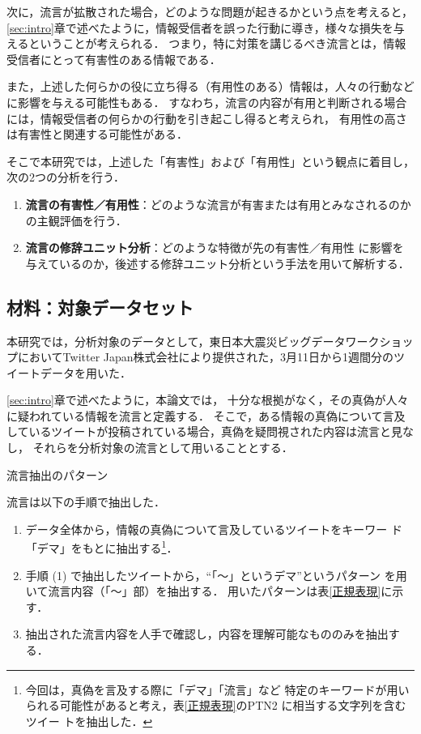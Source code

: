 \documentclass[japanese]{jnlp_1.4}
\begin{document}
次に，流言が拡散された場合，どのような問題が起きるかという点を考えると，
\ref{sec:intro}章で述べたように，情報受信者を誤った行動に導き，様々な損失を与えるということが考えられる．
つまり，特に対策を講じるべき流言とは，情報受信者にとって有害性のある情報である．

また，上述した何らかの役に立ち得る（有用性のある）情報は，人々の行動などに影響を与える可能性もある．
すなわち，流言の内容が有用と判断される場合には，情報受信者の何らかの行動を引き起こし得ると考えられ，
有用性の高さは有害性と関連する可能性がある．



そこで本研究では，上述した「有害性」および「有用性」という観点に着目し，次の2つの分析を行う．
\begin{enumerate}
\item {\bf 流言の有害性／有用性}：どのような流言が有害または有用とみなされるのかの主観評価を行う．
\item {\bf 流言の修辞ユニット分析}：どのような特徴が先の有害性／有用性
  に影響を与えているのか，後述する修辞ユニット分析という手法を用いて解析する．
\end{enumerate}


\subsection{材料：対象データセット}
\label{sec:dataset}

本研究では，分析対象のデータとして，東日本大震災ビッグデータワークショッ
プにおいてTwitter Japan株式会社により提供された，3月11日から1週間分のツ
イートデータを用いた．

\ref{sec:intro}章で述べたように，本論文では， 十分な根拠がなく，その真偽が人々に疑われている情報を流言と定義する．
そこで，ある情報の真偽について言及しているツイートが投稿されている場合，真偽を疑問視された内容は流言と見なし，
それらを分析対象の流言として用いることとする．

\begin{table}[b]
\caption{流言抽出のパターン}
\label{正規表現}

\end{table}

流言は以下の手順で抽出した．
\begin{enumerate}
\item データ全体から，情報の真偽について言及しているツイートをキーワー
  ド「デマ」をもとに抽出する\footnote{今回は，真偽を言及する際に「デマ」「流言」など
特定のキーワードが用いられる可能性があると考え，表\ref{正規表現}のPTN2 に相当する文字列を含むツイー
    トを抽出した．}．
\item 手順 (1) で抽出したツイートから，``「〜」というデマ''というパターン
を用いて流言内容（「〜」部）を抽出する．
用いたパターンは表\ref{正規表現}に示す．
\item 抽出された流言内容を人手で確認し，内容を理解可能なもののみを抽出する．
\end{enumerate}
\end{document}
